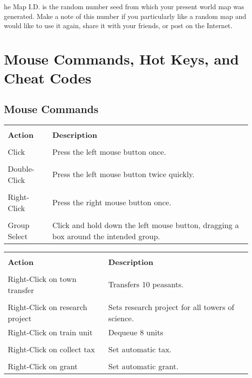 

he Map I.D. is the random number seed from which your present world map was generated. Make a note of this number if you particularly like a random map and would like to use it again, share it with your friends, or post on the Internet.

\section{Mouse Commands, Hot Keys, and Cheat Codes}


\subsection{Mouse Commands}



\begin{tabular}{|p{1in} p{3in}|}
    \hline \\
    \textbf{Action} & \textbf{Description} \\ \\
    \hline
    Click & Press the left mouse button once. \\ \\
    Double-Click & Press the left mouse button twice quickly. \\ \\
    Right-Click    & Press the right mouse button once. \\ \\
    Group Select & Click and hold down the left mouse button, dragging a box around the intended group. \\
    \hline
\end{tabular}    
    
\begin{tabular}{|p{2in} p{2in}|}
    \hline \\
    \textbf{Action} & \textbf{Description} \\ \\
    \hline    
    Right-Click on town transfer & Transfers 10 peasants. \\ \\
    Right-Click on research project    & Sets research project for all towers of science. \\
    Right-Click    on train unit    & Dequeue 8 units \\ \\
    Right-Click on collect tax    & Set automatic tax. \\ \\
    Right-Click on grant    &  Set automatic grant. \\
    \hline
\end{tabular}

